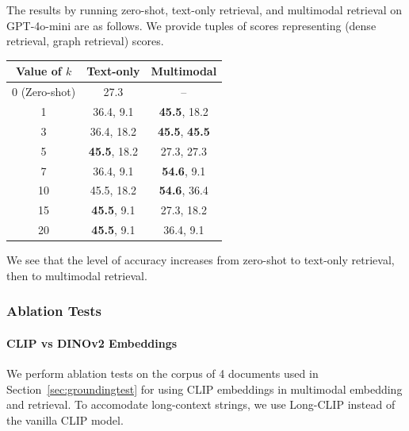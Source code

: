 The results by running zero-shot, text-only retrieval, and multimodal retrieval on GPT-4o-mini are as follows.
We provide tuples of scores representing (dense retrieval, graph retrieval) scores.
\begin{center}
    \begin{tabular}{ccc}
        \toprule
        Value of $k$ & Text-only & Multimodal \\
        \midrule
        0 (Zero-shot) & 27.3 & -- \\
        1 & 36.4, 9.1 & \textbf{45.5}, 18.2 \\
        3 & 36.4, 18.2 & \textbf{45.5}, \textbf{45.5} \\
        5 & \textbf{45.5}, 18.2 & 27.3, 27.3 \\
        7 & 36.4, 9.1 & \textbf{54.6}, 9.1 \\
        10 & 45.5, 18.2 & \textbf{54.6}, 36.4 \\
        15 & \textbf{45.5}, 9.1 & 27.3, 18.2 \\
        20 & \textbf{45.5}, 9.1 & 36.4, 9.1 \\
        \bottomrule
    \end{tabular}
\end{center}

We see that the level of accuracy increases from zero-shot to text-only retrieval, then to multimodal retrieval.

\subsubsection{Ablation Tests}
\label{sec:ablationtests}

\paragraph{CLIP vs DINOv2 Embeddings}
We perform ablation tests on the corpus of 4 documents used in Section~\ref{sec:groundingtest} 
for using CLIP embeddings in multimodal embedding and retrieval.
To accomodate long-context strings, we use Long-CLIP \cite{10.1007/978-3-031-72983-6_18} instead of the vanilla CLIP model.

